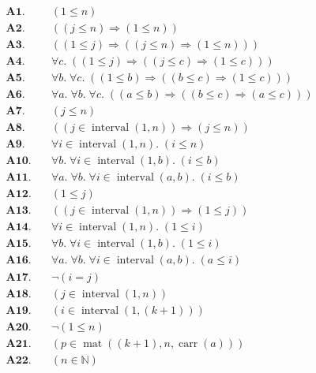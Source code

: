 \documentclass[11pt]{article}
\theoremstyle{plain}
\begin{document}
\begin{align*}
  \mathbf{A1.}\quad & (1 \leq n) \\
  \mathbf{A2.}\quad & ((j \leq n) \Rightarrow (1 \leq n)) \\
  \mathbf{A3.}\quad & ((1 \leq j) \Rightarrow ((j \leq n) \Rightarrow (1 \leq n))) \\
  \mathbf{A4.}\quad & \forall c.\; ((1 \leq j) \Rightarrow ((j \leq c) \Rightarrow (1 \leq c))) \\
  \mathbf{A5.}\quad & \forall b.\; \forall c.\; ((1 \leq b) \Rightarrow ((b \leq c) \Rightarrow (1 \leq c))) \\
  \mathbf{A6.}\quad & \forall a.\; \forall b.\; \forall c.\; ((a \leq b) \Rightarrow ((b \leq c) \Rightarrow (a \leq c))) \\
  \mathbf{A7.}\quad & (j \leq n) \\
  \mathbf{A8.}\quad & ((j \in \operatorname{interval}(1, n)) \Rightarrow (j \leq n)) \\
  \mathbf{A9.}\quad & \forall i \in \operatorname{interval}(1, n).\; (i \leq n) \\
  \mathbf{A10.}\quad & \forall b.\; \forall i \in \operatorname{interval}(1, b).\; (i \leq b) \\
  \mathbf{A11.}\quad & \forall a.\; \forall b.\; \forall i \in \operatorname{interval}(a, b).\; (i \leq b) \\
  \mathbf{A12.}\quad & (1 \leq j) \\
  \mathbf{A13.}\quad & ((j \in \operatorname{interval}(1, n)) \Rightarrow (1 \leq j)) \\
  \mathbf{A14.}\quad & \forall i \in \operatorname{interval}(1, n).\; (1 \leq i) \\
  \mathbf{A15.}\quad & \forall b.\; \forall i \in \operatorname{interval}(1, b).\; (1 \leq i) \\
  \mathbf{A16.}\quad & \forall a.\; \forall b.\; \forall i \in \operatorname{interval}(a, b).\; (a \leq i) \\
  \mathbf{A17.}\quad & \neg (i = j) \\
  \mathbf{A18.}\quad & (j \in \operatorname{interval}(1, n)) \\
  \mathbf{A19.}\quad & (i \in \operatorname{interval}(1, (k + 1))) \\
  \mathbf{A20.}\quad & \neg (1 \leq n) \\
  \mathbf{A21.}\quad & (p \in \operatorname{mat}((k + 1), n, \operatorname{carr}(a))) \\
  \mathbf{A22.}\quad & (n \in \mathbb{N}) \\

\end{align*}
\end{document}
